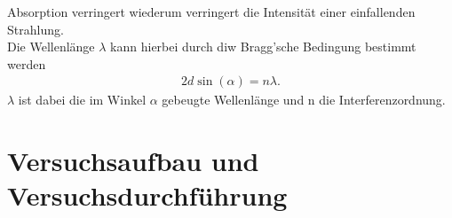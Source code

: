\justifying Absorption verringert wiederum 
verringert die Intensität einer einfallenden Strahlung.\\
Die Wellenlänge $\lambda$ kann hierbei durch diw Bragg'sche Bedingung bestimmt 
werden
\begin{align}
    2d \sin (\alpha)=n \lambda \label{eq:4}.
\end{align}
$\lambda$ ist dabei die im Winkel $\alpha$ gebeugte Wellenlänge und n die Interferenzordnung.



\section{Versuchsaufbau und Versuchsdurchführung}\justifying

